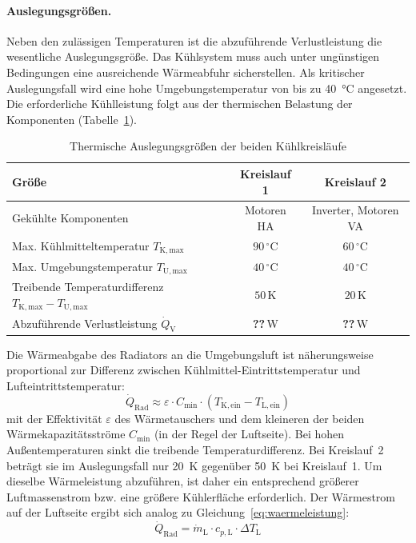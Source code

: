 \paragraph{Auslegungsgrößen.}
Neben den zulässigen Temperaturen ist die abzuführende Verlustleistung die
wesentliche Auslegungsgröße. Das Kühlsystem muss auch unter ungünstigen
Bedingungen eine ausreichende Wärmeabfuhr sicherstellen. Als kritischer
Auslegungsfall wird eine hohe Umgebungstemperatur von bis zu
\SI{40}{\celsius} angesetzt. Die erforderliche Kühlleistung folgt aus der
thermischen Belastung der Komponenten (Tabelle~\ref{tab:thermische_anforderungen}).

\begin{table}[htb]
  \centering
  \caption{Thermische Auslegungsgrößen der beiden Kühlkreisläufe}
  \label{tab:thermische_anforderungen}
  \begin{tabular}{|l|c|c|}
    \hline
    Größe & Kreislauf 1 & Kreislauf 2 \\
    \hline
    Gekühlte Komponenten & Motoren HA & Inverter, Motoren VA \\
    \hline
    Max. Kühlmitteltemperatur $T_\mathrm{K,max}$ & $90\,^{\circ}\mathrm{C}$ & $60\,^{\circ}\mathrm{C}$ \\
    \hline
    Max. Umgebungstemperatur $T_\mathrm{U,max}$ & $40\,^{\circ}\mathrm{C}$ & $40\,^{\circ}\mathrm{C}$ \\
    \hline
    Treibende Temperaturdifferenz $T_\mathrm{K,max}-T_\mathrm{U,max}$ & $50\,\mathrm{K}$ & $20\,\mathrm{K}$ \\
    \hline
    Abzuführende Verlustleistung $\dot{Q}_\mathrm{V}$ & \textbf{??}\,W & \textbf{??}\,W \\
    \hline
  \end{tabular}
\end{table}

Die Wärmeabgabe des Radiators an die Umgebungsluft ist näherungsweise
proportional zur Differenz zwischen Kühlmittel-Eintrittstemperatur und
Lufteintrittstemperatur:
\begin{equation}
  \dot{Q}_\mathrm{Rad} \approx \varepsilon \cdot C_\mathrm{min} \cdot
  \left(T_\mathrm{K,ein} - T_\mathrm{L,ein}\right)
  \label{eq:radiator}
\end{equation}
mit der Effektivität $\varepsilon$ des Wärmetauschers und dem kleineren der
beiden Wärmekapazitätsströme $C_\mathrm{min}$ (in der Regel der Luftseite). Bei
hohen Außentemperaturen sinkt die treibende Temperaturdifferenz. Bei
Kreislauf~2 beträgt sie im Auslegungsfall nur \SI{20}{\kelvin} gegenüber
\SI{50}{\kelvin} bei Kreislauf~1. Um dieselbe Wärmeleistung abzuführen, ist daher
ein entsprechend größerer Luftmassenstrom bzw. eine größere Kühlerfläche
erforderlich. Der Wärmestrom auf der Luftseite ergibt sich analog zu
Gleichung~\eqref{eq:waermeleistung}:
\begin{equation}
  \dot{Q}_\mathrm{Rad} = \dot{m}_\mathrm{L} \cdot c_{p,\mathrm{L}} \cdot
  \Delta T_\mathrm{L}
  \label{eq:luftseite}
\end{equation}

